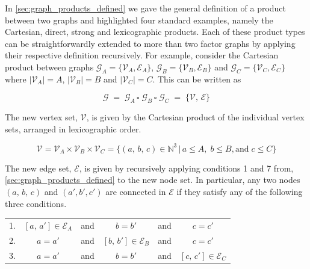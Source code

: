 In \cref{sec:graph_products_defined} we gave the general definition of a product between two graphs and highlighted four standard examples, namely the Cartesian, direct, strong and lexicographic products. Each of these product types can be straightforwardly extended to more than two factor graphs by applying their respective definition recursively. For example, consider the Cartesian product between graphs $\mathcal{G}_A = \{\mathcal{V}_A, \mathcal{E}_A\}$, $\mathcal{G}_B = \{\mathcal{V}_B, \mathcal{E}_B\}$ and $\mathcal{G}_C = \{\mathcal{V}_C, \mathcal{E}_C\}$ where $|\mathcal{V}_A| = A$, $|\mathcal{V}_B| = B$ and $|\mathcal{V}_C| = C$. This can be written as 

\begin{equation}
    \mathcal{G} \; = \; \mathcal{G}_A \, \square \; \mathcal{G}_B \, \square \; \mathcal{G}_C \; = \; \{\mathcal{V}, \, \mathcal{E}\}
\end{equation}

The new vertex set, $\mathcal{V}$, is given by the Cartesian product of the individual vertex sets, arranged in lexicographic order. 

\begin{equation}
    \mathcal{V} = \mathcal{V}_A \times \mathcal{V}_B \times \mathcal{V}_C = \{(a, \, b, \, c) \in \mathbb{N}^3 \, | \, a \leq A, \; b \leq B, \text{and} \;  c \leq C\}
\end{equation}

The new edge set, $\mathcal{E}$, is given by recursively applying conditions 1 and 7 from, \cref{sec:graph_products_defined} to the new node set. In particular, any two nodes $(a, \, b, \, c)$ and $(a', b', c')$ are connected in $\mathcal{E}$ if they satisfy any of the following three conditions. 

\vspace{0.5cm}

\begin{table}[h]
    \def\arraystretch{1.5}
    \centering
    \begin{tabular}{lclclc}
        1. & $[a, \, a'] \in \mathcal{E}_A$    & and & $b = b'$  & and & $c = c'$             \\
        2. & $a = a'$    & and & $[b, \, b'] \in \mathcal{E}_B$   & and & $c = c'$             \\
        3. & $a = a'$    & and & $b = b'$  & and & $[c, \, c'] \in \mathcal{E}_C$              \\
    \end{tabular}
\end{table}


